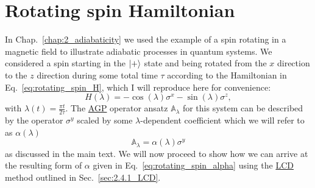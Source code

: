 \documentclass[a4paper,oneside,11pt]{book}
\newcommand{\sx}{\sigma^x}
\newcommand{\sy}{\sigma^y}
\newcommand{\sz}{\sigma^z}
\newcommand{\approxAGP}{\mathbb{A}_{\lambda}}
\newcommand{\acrref}[1]{\hyperref[acr:#1]{#1}}
\begin{document}
\appendix

\chapter{Rotating spin Hamiltonian}\label{app:rotating_spin_hamiltonian}

In Chap.~\ref{chap:2_adiabaticity} we used the example of a spin rotating in a magnetic field to illustrate adiabatic processes in quantum systems. We considered a spin starting in the $\ket{+}$ state and being rotated from the $x$ direction to the $z$ direction during some total time $\tau$ according to the Hamiltonian in Eq.~\eqref{eq:rotating_spin_H}, which I will reproduce here for convenience:
\begin{equation}\label{eq:rotating_spin_H_lambda_2}
    H(\lambda) = -\cos(\lambda)\sx - \sin(\lambda)\sz,
\end{equation}
with $\lambda(t) = \frac{\pi t}{2 \tau}$. The \acrref{AGP} operator ansatz $\approxAGP$ for this system can be described by the operator $\sy$ scaled by some $\lambda$-dependent coefficient which we will refer to as $\alpha(\lambda)$
\begin{equation}
    \approxAGP = \alpha(\lambda) \sy
\end{equation}
as discussed in the main text. We will now proceed to show how we can arrive at the resulting form of $\alpha$ given in Eq.~\eqref{eq:rotating_spin_alpha} using the \acrref{LCD} method outlined in Sec.~\ref{sec:2.4.1_LCD}.
\end{document}
